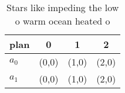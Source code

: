 \documentclass[a4paper]{article}
\begin{document}
\begin{table}
\begin{adjustbox}{width=0.6\columnwidth}
\begin{tabular}{|l|l|l|l|}
\hline
\textbf{plan} & \multicolumn{1}{c|}{\textbf{0}} & \multicolumn{1}{c|}{\textbf{1}} & \multicolumn{1}{c|}{\textbf{2}} \\ \hline
\textbf{$a_0$}  & (0,0) & (1,0) & (2,0) \\ \hline
\textbf{$a_1$}  & (0,0) & (1,0) & (2,0) \\ \hline
\end{tabular}
\end{adjustbox}
\caption{Stars like impeding the low o warm ocean heated o
}
\end{table}
\end{document}
